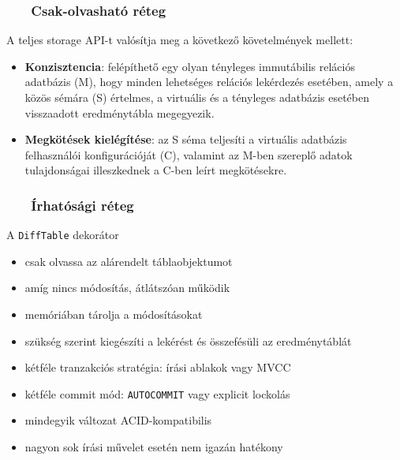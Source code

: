 \documentclass[
]{beamer}
\newcommand{\slidetitle}[2]{\frametitle{{\small #1 ~ \ding{226} ~ } \normalsize \textbf{#2} }}
\begin{document}
\begin{frame}
    \slidetitle{\sectionshorttitle}{Csak-olvasható réteg}
    
    A teljes storage API-t valósítja meg a következő követelmények mellett:
    
    \vspace{0.5cm}
    
    \begin{itemize}
        \setlength\itemsep{1.5em}
        \item \textbf{Konzisztencia}:
            felépíthető egy olyan tényleges immutábilis relációs adatbázis (M),
            hogy minden lehetséges relációs lekérdezés esetében,
            amely a közös sémára (S) értelmes, a virtuális és a tényleges adatbázis
            esetében visszaadott eredménytábla megegyezik.
        \item \textbf{Megkötések kielégítése}:
            az S séma teljesíti a virtuális adatbázis felhasználói konfigurációját (C),
            valamint az M-ben szereplő adatok tulajdonságai illeszkednek a C-ben leírt megkötésekre.
    \end{itemize}
\end{frame}

\begin{frame}
    \slidetitle{\sectionshorttitle}{Írhatósági réteg}
    
    {\color{beamer@blendedblue}A \texttt{DiffTable} dekorátor}
    
    \begin{itemize}
        \item csak olvassa az alárendelt táblaobjektumot
        \item amíg nincs módosítás, átlátszóan működik
        \item memóriában tárolja a módosításokat
        \item szükség szerint kiegészíti a lekérést és összefésüli az eredménytáblát
    \end{itemize}
    
    \vspace{0.4cm}
    
    
    \begin{itemize}
        \item kétféle tranzakciós stratégia: írási ablakok vagy MVCC
        \item kétféle commit mód: \texttt{AUTOCOMMIT} vagy explicit lockolás
        \item mindegyik változat ACID-kompatibilis
        \item nagyon sok írási művelet esetén nem igazán hatékony
    \end{itemize}
\end{frame}
\end{document}
